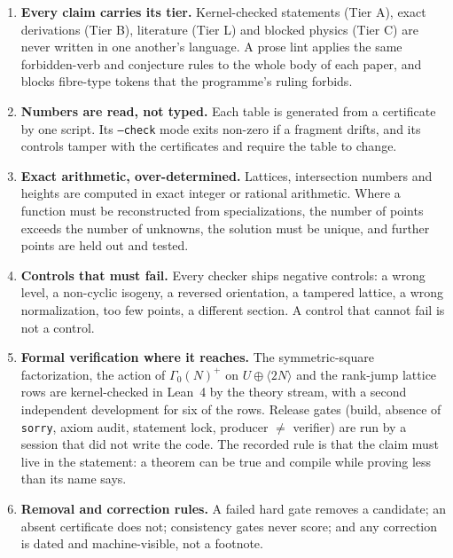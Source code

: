 \documentclass[11pt,a4paper]{article}
\theoremstyle{remark}
\begin{document}
\begin{enumerate}
\item \textbf{Every claim carries its tier.} Kernel-checked statements (Tier A), exact derivations (Tier B), literature (Tier L) and
  blocked physics (Tier C) are never written in one another's language. A prose lint applies the same forbidden-verb and conjecture
  rules to the whole body of each paper, and blocks fibre-type tokens that the programme's ruling forbids.
\item \textbf{Numbers are read, not typed.} Each table is generated from a certificate by one script. Its \texttt{--check} mode exits
  non-zero if a fragment drifts, and its controls tamper with the certificates and require the table to change.
\item \textbf{Exact arithmetic, over-determined.} Lattices, intersection numbers and heights are computed in exact integer or rational
  arithmetic. Where a function must be reconstructed from specializations, the number of points exceeds the number of unknowns, the
  solution must be unique, and further points are held out and tested.
\item \textbf{Controls that must fail.} Every checker ships negative controls: a wrong level, a non-cyclic isogeny, a reversed
  orientation, a tampered lattice, a wrong normalization, too few points, a different section. A control that cannot fail is not a
  control.
\item \textbf{Formal verification where it reaches.} The symmetric-square factorization, the action of $\Gamma_0(N)^+$ on
  $U\oplus\langle2N\rangle$ and the rank-jump lattice rows are kernel-checked in Lean~4 by the theory stream, with a second
  independent development for six of the rows. Release gates (build, absence of \texttt{sorry}, axiom audit, statement lock,
  producer $\ne$ verifier) are run by a session that did not write the code. The recorded rule is that the claim must live in the
  statement: a theorem can be true and compile while proving less than its name says.
\item \textbf{Removal and correction rules.} A failed hard gate removes a candidate; an absent certificate does not; consistency gates
  never score; and any correction is dated and machine-visible, not a footnote.
\end{enumerate}
\end{document}
